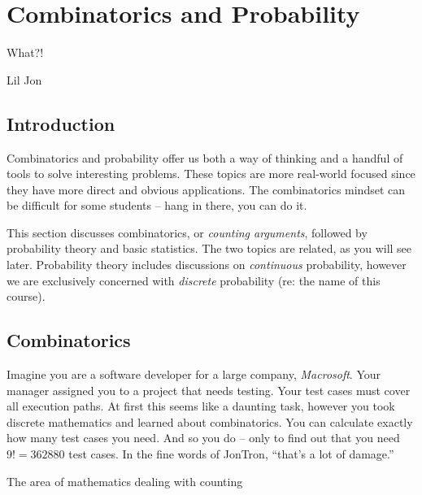 \documentclass[main.tex]{subfiles}
\begin{document}
\chapter{Combinatorics and Probability}

\epigraph{What?!}{Lil Jon}

\minitoc

\section{Introduction}

Combinatorics and probability offer us both a way of thinking and a handful of tools to solve interesting problems. These topics are more real-world focused since they have more direct and obvious applications. The combinatorics mindset can be difficult for some students -- hang in there, you can do it.

This section discusses combinatorics, or \textit{counting arguments}, followed by probability theory and basic statistics. The two topics are related, as you will see later. Probability theory includes discussions on \textit{continuous} probability, however we are exclusively concerned with \textit{discrete} probability (re: the name of this course).

\section{Combinatorics}

Imagine you are a software developer for a large company, \textit{Macrosoft}. Your manager assigned you to a project that needs testing. Your test cases must cover all execution paths. At first this seems like a daunting task, however you took discrete mathematics and learned about combinatorics. You can calculate exactly how many test cases you need. And so you do -- only to find out that you need \(9! = 362880\) test cases. In the fine words of JonTron, ``that's a lot of damage.''

\begin{defn}
	The area of mathematics dealing with counting
\end{defn}

\end{document}
